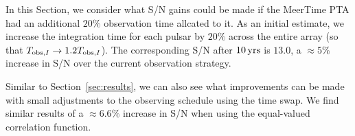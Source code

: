 
In this Section, we consider what S/N gains could be made if the MeerTime PTA had an additional $20\%$ observation time allcated to it. 
As an initial estimate, we increase the integration time for each pulsar by $20\%$ across the entire array (so that $T_{{\rm obs},I} \rightarrow 1.2 T_{{\rm obs},I}$). 
The corresponding S/N after $10\,{\rm yrs}$ is $13.0$, a $\approx 5\%$ increase in S/N over the current observation strategy. 

Similar to Section~\ref{sec:results}, we can also see what improvements can be made with small adjustments to the observing schedule using the time swap. 
We find similar results of a $\approx 6.6\%$ increase in S/N when using the equal-valued correlation function. 





